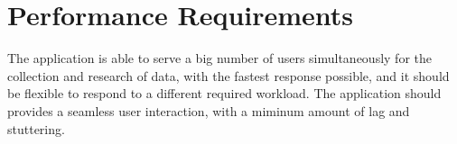 \section{Performance Requirements}
The application is able to serve a big number of users simultaneously for the collection and research  of data, with the fastest response possible, and it should be flexible to respond to  a different required workload. The application should provides a seamless user interaction, with a miminum amount of lag and stuttering.